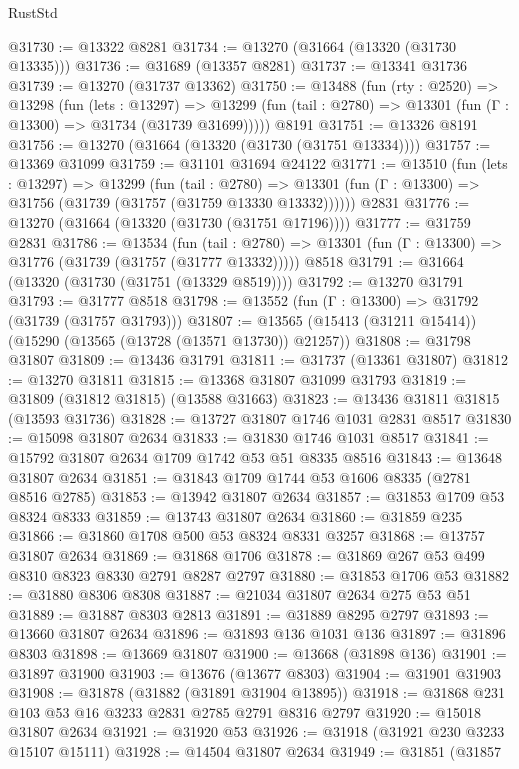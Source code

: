 \begin{lexlean}{RustStd}
\begin{coremodule}
@31730 := @13322 @8281
@31734 := @13270 (@31664 (@13320 (@31730 @13335)))
@31736 := @31689 (@13357 @8281)
@31737 := @13341 @31736
@31739 := @13270 (@31737 @13362)
@31750 := @13488
    (fun (rty : @2520) =>
    @13298
      (fun (lets : @13297) =>
      @13299 (fun (tail : @2780) => @13301 (fun (Γ : @13300) => @31734 (@31739 @31699)))))
    @8191
@31751 := @13326 @8191
@31756 := @13270 (@31664 (@13320 (@31730 (@31751 @13334))))
@31757 := @13369 @31099
@31759 := @31101 @31694 @24122
@31771 := @13510
    (fun (lets : @13297) =>
    @13299
      (fun (tail : @2780) =>
      @13301 (fun (Γ : @13300) => @31756 (@31739 (@31757 (@31759 @13330 @13332))))))
    @2831
@31776 := @13270 (@31664 (@13320 (@31730 (@31751 @17196))))
@31777 := @31759 @2831
@31786 := @13534
    (fun (tail : @2780) => @13301 (fun (Γ : @13300) => @31776 (@31739 (@31757 (@31777 @13332)))))
    @8518
@31791 := @31664 (@13320 (@31730 (@31751 (@13329 @8519))))
@31792 := @13270 @31791
@31793 := @31777 @8518
@31798 := @13552 (fun (Γ : @13300) => @31792 (@31739 (@31757 @31793)))
@31807 := @13565 (@15413 (@31211 @15414)) (@15290 (@13565 (@13728 (@13571 @13730)) @21257))
@31808 := @31798 @31807
@31809 := @13436 @31791
@31811 := @31737 (@13361 @31807)
@31812 := @13270 @31811
@31815 := @13368 @31807 @31099 @31793
@31819 := @31809 (@31812 @31815) (@13588 @31663)
@31823 := @13436 @31811 @31815 (@13593 @31736)
@31828 := @13727 @31807 @1746 @1031 @2831 @8517
@31830 := @15098 @31807 @2634
@31833 := @31830 @1746 @1031 @8517
@31841 := @15792 @31807 @2634 @1709 @1742 @53 @51 @8335 @8516
@31843 := @13648 @31807 @2634
@31851 := @31843 @1709 @1744 @53 @1606 @8335 (@2781 @8516 @2785)
@31853 := @13942 @31807 @2634
@31857 := @31853 @1709 @53 @8324 @8333
@31859 := @13743 @31807 @2634
@31860 := @31859 @235
@31866 := @31860 @1708 @500 @53 @8324 @8331 @3257
@31868 := @13757 @31807 @2634
@31869 := @31868 @1706
@31878 := @31869 @267 @53 @499 @8310 @8323 @8330 @2791 @8287 @2797
@31880 := @31853 @1706 @53
@31882 := @31880 @8306 @8308
@31887 := @21034 @31807 @2634 @275 @53 @51
@31889 := @31887 @8303 @2813
@31891 := @31889 @8295 @2797
@31893 := @13660 @31807 @2634
@31896 := @31893 @136 @1031 @136
@31897 := @31896 @8303
@31898 := @13669 @31807
@31900 := @13668 (@31898 @136)
@31901 := @31897 @31900
@31903 := @13676 (@13677 @8303)
@31904 := @31901 @31903
@31908 := @31878 (@31882 (@31891 @31904 @13895))
@31918 := @31868 @231 @103 @53 @16 @3233 @2831 @2785 @2791 @8316 @2797
@31920 := @15018 @31807 @2634
@31921 := @31920 @53
@31926 := @31918 (@31921 @230 @3233 @15107 @15111)
@31928 := @14504 @31807 @2634
@31949 := @31851
    (@31857

\end{coremodule}
\end{lexlean}
